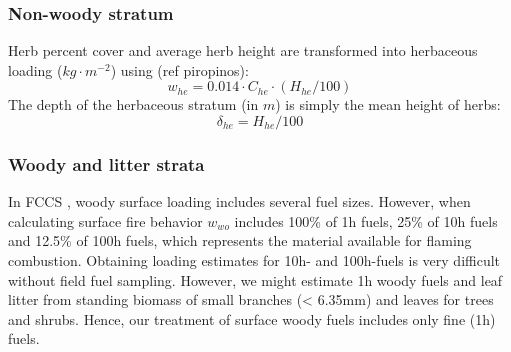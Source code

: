 \documentclass[]{book}
\begin{document}
\hypertarget{non-woody-stratum}{%
\subsubsection{Non-woody stratum}\label{non-woody-stratum}}

Herb percent cover and average herb height are transformed into herbaceous loading (\(kg\cdot m^{-2}\)) using (ref piropinos):
\begin{equation}
w_{he} = 0.014 \cdot C_{he} \cdot (H_{he}/100)
\end{equation}
The depth of the herbaceous stratum (in \(m\)) is simply the mean height of herbs:
\begin{equation}
\delta_{he} = H_{he}/100
\end{equation}

\hypertarget{woody-and-litter-strata}{%
\subsubsection{Woody and litter strata}\label{woody-and-litter-strata}}

In FCCS \citep{Prichard2013}, woody surface loading includes several fuel sizes. However, when calculating surface fire behavior \(w_{wo}\) includes 100\% of 1h fuels, 25\% of 10h fuels and 12.5\% of 100h fuels, which represents the material available for flaming combustion. Obtaining loading estimates for 10h- and 100h-fuels is very difficult without field fuel sampling. However, we might estimate 1h woody fuels and leaf litter from standing biomass of small branches (\textless{} 6.35mm) and leaves for trees and shrubs. Hence, our treatment of surface woody fuels includes only fine (1h) fuels.
\end{document}
